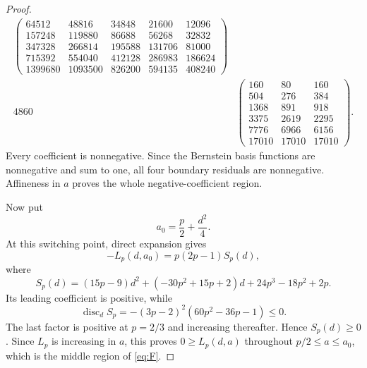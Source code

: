 \documentclass[11pt]{article}
\begin{document}
\begin{proof}
\[\begin{array}{c|c}
\begin{pmatrix}
64512&48816&34848&21600&12096\\
157248&119880&86688&56268&32832\\
347328&266814&195588&131706&81000\\
715392&554040&412128&286983&186624\\
1399680&1093500&826200&594135&408240
\end{pmatrix}
\\[18pt]
4860&
\begin{pmatrix}
160&80&160\\
504&276&384\\
1368&891&918\\
3375&2619&2295\\
7776&6966&6156\\
17010&17010&17010
\end{pmatrix}.
\end{array}
\]
Every coefficient is nonnegative.  Since the Bernstein basis functions are
nonnegative and sum to one, all four boundary residuals are nonnegative.
Affineness in $a$ proves the whole negative-coefficient region.

Now put
\[
 a_0=\frac p2+\frac{d^2}{4}.
\]
At this switching point, direct expansion gives
\begin{equation}
 -L_p(d,a_0)=p(2p-1)S_p(d),
 \label{eq:switch}
\end{equation}
where
\[
 S_p(d)=(15p-9)d^2+(-30p^2+15p+2)d
          +24p^3-18p^2+2p.
\]
Its leading coefficient is positive, while
\[
 \operatorname{disc}_d S_p
 =-(3p-2)^2(60p^2-36p-1)\le0.
\]
The last factor is positive at $p=2/3$ and increasing thereafter.  Hence
$S_p(d)\ge0$.  Since $L_p$ is increasing in $a$, this proves
$0\ge L_p(d,a)$ throughout $p/2\le a\le a_0$, which is the middle region
of \eqref{eq:F}.


\end{proof}
\end{document}
